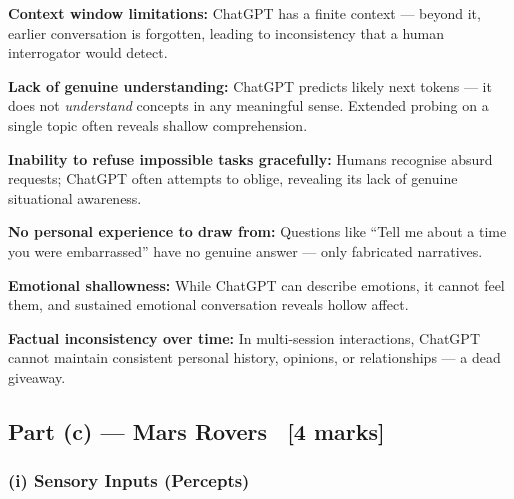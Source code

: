 \documentclass[12pt, a4paper]{article}
\begin{document}
\begin{keypoints}
  \item \textbf{Context window limitations:} ChatGPT has a finite context — beyond it, earlier conversation is forgotten, leading to inconsistency that a human interrogator would detect.
  \item \textbf{Lack of genuine understanding:} ChatGPT predicts likely next tokens — it does not \emph{understand} concepts in any meaningful sense. Extended probing on a single topic often reveals shallow comprehension.
  \item \textbf{Inability to refuse impossible tasks gracefully:} Humans recognise absurd requests; ChatGPT often attempts to oblige, revealing its lack of genuine situational awareness.
  \item \textbf{No personal experience to draw from:} Questions like ``Tell me about a time you were embarrassed'' have no genuine answer — only fabricated narratives.
  \item \textbf{Emotional shallowness:} While ChatGPT can describe emotions, it cannot feel them, and sustained emotional conversation reveals hollow affect.
  \item \textbf{Factual inconsistency over time:} In multi-session interactions, ChatGPT cannot maintain consistent personal history, opinions, or relationships — a dead giveaway.
\end{keypoints}

\subsection{Part (c) — Mars Rovers \ [4 marks]}

\subsubsection*{(i) Sensory Inputs (Percepts)}
\end{document}
